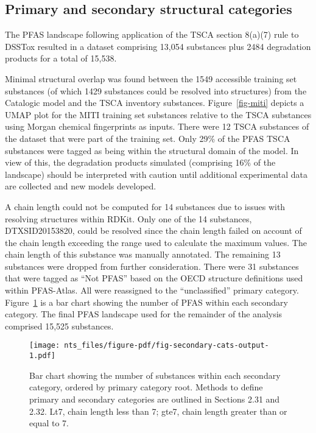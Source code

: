 \documentclass[
  super,
  preprint,
  3p]{elsarticle}
\begin{document}
\hypertarget{primary-and-secondary-structural-categories}{%
\subsection{Primary and secondary structural
categories}\label{primary-and-secondary-structural-categories}}

The PFAS landscape following application of the TSCA section 8(a)(7)
rule to DSSTox resulted in a dataset comprising 13,054 substances plus
2484 degradation products for a total of 15,538.

Minimal structural overlap was found between the 1549 accessible
training set substances (of which 1429 substances could be resolved into
structures) from the Catalogic model and the TSCA inventory substances.
Figure~\ref{fig-miti} depicts a UMAP plot for the MITI training set
substances relative to the TSCA substances using Morgan chemical
fingerprints as inputs. There were 12 TSCA substances of the dataset
that were part of the training set. Only 29\% of the PFAS TSCA
substances were tagged as being within the structural domain of the
model. In view of this, the degradation products simulated (comprising
16\% of the landscape) should be interpreted with caution until
additional experimental data are collected and new models developed.

A chain length could not be computed for 14 substances due to issues
with resolving structures within RDKit. Only one of the 14 substances,
DTXSID20153820, could be resolved since the chain length failed on
account of the chain length exceeding the range used to calculate the
maximum values. The chain length of this substance was manually
annotated. The remaining 13 substances were dropped from further
consideration. There were 31 substances that were tagged as ``Not PFAS''
based on the OECD structure definitions used within PFAS-Atlas. All were
reassigned to the ``unclassified'' primary category.
Figure~\ref{fig-secondary-cats} is a bar chart showing the number of
PFAS within each secondary category. The final PFAS landscape used for
the remainder of the analysis comprised 15,525 substances.

\begin{figure}

{\centering \texttt{[image: nts\_files/figure-pdf/fig-secondary-cats-output-1.pdf]}

}

\caption{\label{fig-secondary-cats}Bar chart showing the number of
substances within each secondary category, ordered by primary category
root. Methods to define primary and secondary categories are outlined in
Sections 2.31 and 2.32. Lt7, chain length less than 7; gte7, chain
length greater than or equal to 7.}

\end{figure}
\end{document}
